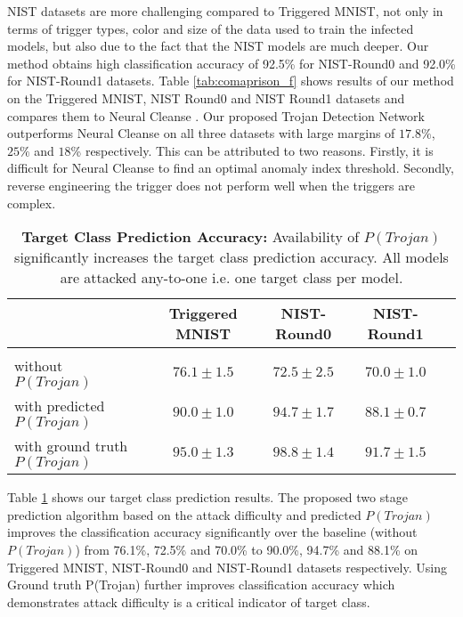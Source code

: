 \documentclass{article}
\begin{document}
NIST datasets are more challenging compared to Triggered MNIST, not only in terms of trigger types, color and size of the data used to train the infected models, but also due to the fact that the NIST models are much deeper. Our method obtains high classification accuracy of 92.5\% for NIST-Round0 and 92.0\% for NIST-Round1 datasets.  Table \ref{tab:comaprison_f} shows results of our method on the Triggered MNIST, NIST Round0 and NIST Round1 datasets and compares them to Neural Cleanse \cite{wang2019neural}. Our proposed Trojan Detection Network outperforms Neural Cleanse on all three datasets with large margins of $17.8\%$, $25\%$ and $18$\% respectively. This can be attributed to two reasons. Firstly, it is difficult for Neural Cleanse to find an optimal anomaly index threshold. Secondly, reverse engineering the trigger does not perform well when the triggers are complex.
\begin{table}[h!]
\caption{\textbf{Target Class Prediction Accuracy:} Availability of $P(Trojan)$ significantly increases the target class prediction accuracy. All models are attacked any-to-one i.e. one target class per model.}
\begin{center}
\label{tab:tar_pred}
\begin{tabular}{|l|c|c|c|c|}
\hline

 & \textbf{Triggered MNIST} &  \textbf{NIST-Round0} &
 \textbf{NIST-Round1}\\ \hline
\\[-1em] \hline
 without $P(Trojan)$ & $76.1\pm1.5$   & $72.5\pm2.5$ & $70.0\pm1.0$ \\  \hline
 with predicted $P(Trojan)$ & $90.0\pm1.0$  & $94.7\pm1.7$ & $88.1\pm0.7$ \\\hline
 with ground truth $P(Trojan)$ & $95.0\pm1.3$ & $98.8\pm1.4$ & $91.7\pm1.5$ \\ \hline

\end{tabular}
\end{center}
\end{table}

Table \ref{tab:tar_pred} shows our target class prediction results. The proposed two stage prediction algorithm based on the attack difficulty and predicted $P(Trojan)$ improves the classification accuracy significantly over the baseline (without $P(Trojan)$) from 76.1\%, 72.5\% and 70.0\% to 90.0\%, 94.7\% and 88.1\% on Triggered MNIST, NIST-Round0 and NIST-Round1 datasets respectively. Using Ground truth P(Trojan) further improves classification accuracy which demonstrates attack difficulty is a critical indicator of target class.
\end{document}
